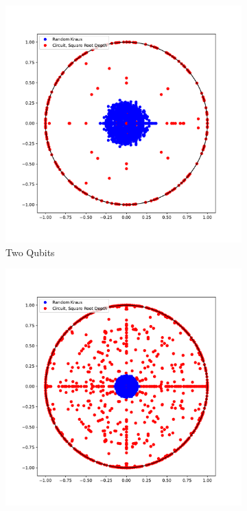 \documentclass{article}
\begin{document}
\begin{figure}[htbp]
\begin{subfigure}[t]{0.3\textwidth}
    \includegraphics[width=\linewidth]{../figures/twoQubit_squareRootDepth}
\caption{Two Qubits}
\label{fig:figure14_1}
\end{subfigure}\hfill
\begin{subfigure}[t]{0.3\textwidth}
  \includegraphics[width=\linewidth]{../figures/threeQubit_squareRootDepth}

\end{subfigure}
\end{figure}
\end{document}
